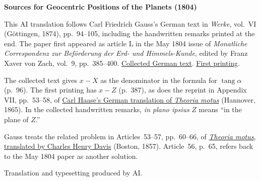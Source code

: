 \clearpage\thispagestyle{empty}
\begin{center}\textbf{Sources for Geocentric Positions of the Planets (1804)}\end{center}
\noindent This AI translation follows Carl Friedrich Gauss’s German text in \textit{Werke}, vol.~VI (Göttingen, 1874), pp.~94--105, including the handwritten remarks printed at the end. The paper first appeared as article L in the May 1804 issue of \textit{Monatliche Correspondenz zur Beförderung der Erd- und Himmels-Kunde}, edited by Franz Xaver von Zach, vol.~9, pp.~385--400. \href{https://gdz.sub.uni-goettingen.de/id/PPN236007467}{Collected German text}. \href{https://www.digitale-sammlungen.de/en/view/bsb10538601?page=421}{First printing}.
\par\smallskip\noindent The collected text gives \(x-X\) as the denominator in the formula for \(\operatorname{tang}\alpha\) (p.~96). The first printing has \(x-Z\) (p.~387), as does the reprint in Appendix VII, pp.~53--58, of \href{https://gdz.sub.uni-goettingen.de/id/PPN60187157X}{Carl Haase’s German translation of \textit{Theoria motus}} (Hannover, 1865). In the collected handwritten remarks, \textit{in plano ipsius} \(Z\) means “in the plane of \(Z\).”
\par\smallskip\noindent Gauss treats the related problem in Articles~53--57, pp.~60--66, of \href{https://www2.karlin.mff.cuni.cz/~tuma/Aplikace21/theoryofmotionof00gausuoft.pdf#page=89}{\textit{Theoria motus}, translated by Charles Henry Davis} (Boston, 1857). Article~56, p.~65, refers back to the May 1804 paper as another solution.
\par\smallskip\noindent Translation and typesetting produced by AI.
\clearpage
